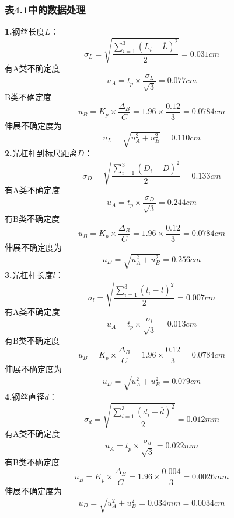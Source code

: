 \documentclass{article}
\def\kong{\hspace*{2em}}
\begin{document}
\subsubsection{表4.1中的数据处理}
    \kong \textbf{1.}钢丝长度$L$：\\
    $$
     \sigma_{ L}=\sqrt{\frac{\sum_{i=1}^{3}\left(L_i-\overline{ L}\right)^2}{2}}=0.031cm
    $$
    有A类不确定度
    $$
        u_A=t_p\times\frac{\sigma_L}{\sqrt{3}}=0.077cm
    $$
    B类不确定度
    $$
        u_B=K_p\times \frac{\Delta_B}{C}=1.96\times \frac{0.12}{3}=0.0784cm
    $$
    伸展不确定度为
    $$
        u_L=\sqrt{u_A^2+u_B^2} =0.110cm
    $$
    \kong \textbf{2.}光杠杆到标尺距离$D$：\\
    $$
        \sigma_{ D}=\sqrt{\frac{\sum_{i=1}^{3}\left( D_i-\overline{ D}\right)^2}{2}}=0.133cm
    $$
    有A类不确定度
    $$
        u_A=t_p\times\frac{\sigma_D}{\sqrt{3}}=0.244cm
    $$
    有B类不确定度
    $$
        u_B=K_p\times \frac{\Delta_B}{C}=1.96\times \frac{0.12}{3}=0.0784cm 
    $$
    伸展不确定度为
    $$
        u_D=\sqrt{u_A^2+u_B^2} =0.256cm
    $$
    \kong \textbf{3.}光杠杆长度$l$：
    $$
        \sigma_{ l}=\sqrt{\frac{\sum_{i=1}^{3}\left( l_i-\overline{ l}\right)^2}{2}}=0.007cm
    $$
    有A类不确定度
    $$
        u_A=t_p\times\frac{\sigma_l}{\sqrt{3}}=0.013cm
    $$
    有B类不确定度
    $$
        u_B=K_p\times \frac{\Delta_B}{C}=1.96\times \frac{0.12}{3}=0.0784cm 
    $$
    伸展不确定度为
    $$
        u_D=\sqrt{u_A^2+u_B^2} =0.079cm
    $$
    \kong \textbf{4.}钢丝直径$d$：
    $$
        \sigma_{ d}=\sqrt{\frac{\sum_{i=1}^{3}\left( d_i-\overline{ d}\right)^2}{2}}=0.012mm
    $$
    有A类不确定度
    $$
        u_A=t_p\times\frac{\sigma_d}{\sqrt{3}}=0.022mm
    $$
    有B类不确定度
    $$
        u_B=K_p\times \frac{\Delta_B}{C}=1.96\times \frac{0.004}{3}=0.0026mm 
    $$
    伸展不确定度为
    $$
        u_D=\sqrt{u_A^2+u_B^2} =0.034mm=0.0034cm
    $$
\newpage
\end{document}

